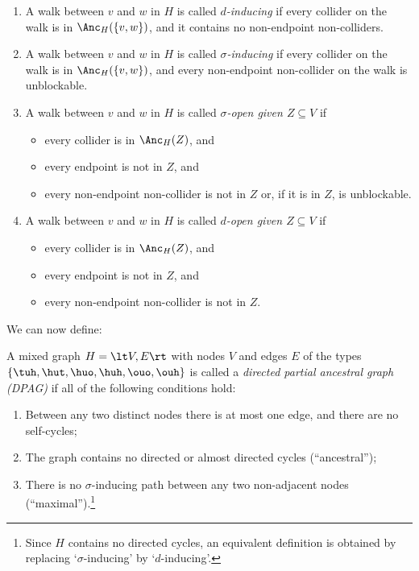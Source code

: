 \begin{Def}
\begin{enumerate}
    \item A walk between $v$ and $w$ in $H$ is called \emph{$d$-inducing} if every collider on the walk is in $\Anc_H(\{v,w\})$, and it contains no non-endpoint non-colliders.
    \item A walk between $v$ and $w$ in $H$ is called \emph{$\sigma$-inducing} if every collider on the walk is in $\Anc_H(\{v,w\})$, and every non-endpoint non-collider on the walk is unblockable.
    \item A walk between $v$ and $w$ in $H$ is called \emph{$\sigma$-open given $Z \subseteq V$} if 
      \begin{itemize}
        \item every collider is in $\Anc_H(Z)$, and
        \item every endpoint is not in $Z$, and
        \item every non-endpoint non-collider is not in $Z$ or, if it is in $Z$, is unblockable.
      \end{itemize}
    \item A walk between $v$ and $w$ in $H$ is called \emph{$d$-open given $Z \subseteq V$} if 
      \begin{itemize}
        \item every collider is in $\Anc_H(Z)$, and
        \item every endpoint is not in $Z$, and
        \item every non-endpoint non-collider is not in $Z$.
      \end{itemize}
  \end{enumerate}
\end{Def}
We can now define:
\begin{Def}\label{def:dpag}
  A mixed graph $H = \lt V,E\rt$ with nodes $V$ and edges $E$ of the types $\{\tuh,\hut,\huo,\huh,\ouo,\ouh\}$ is called a \emph{directed partial ancestral graph (DPAG)} if all of the following conditions hold:
  \begin{enumerate}
    \item Between any two distinct nodes there is at most one edge, and there are no self-cycles;
    \item The graph contains no directed or almost directed cycles (``ancestral'');
    \item There is no $\sigma$-inducing path between any two non-adjacent nodes (``maximal'').\footnote{Since $H$ contains no directed cycles, an equivalent definition is obtained by replacing `$\sigma$-inducing' by `$d$-inducing'.}
  \end{enumerate}
\end{Def}
